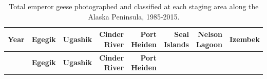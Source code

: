 \documentclass[]{article}
\begin{document}
\begin{longtable}[]{@{}rrrrrrrr@{}}
\caption{Total emperor geese photographed and classified at each staging
area along the Alaska Peninsula, 1985-2015.}\tabularnewline
\toprule
\begin{minipage}[b]{0.08\columnwidth}\raggedleft\strut
\textbf{Year}\strut
\end{minipage} & \begin{minipage}[b]{0.10\columnwidth}\raggedleft\strut
\textbf{Egegik}\strut
\end{minipage} & \begin{minipage}[b]{0.11\columnwidth}\raggedleft\strut
\textbf{Ugashik}\strut
\end{minipage} & \begin{minipage}[b]{0.08\columnwidth}\raggedleft\strut
\textbf{Cinder River}\strut
\end{minipage} & \begin{minipage}[b]{0.14\columnwidth}\raggedleft\strut
\textbf{Port Heiden}\strut
\end{minipage} & \begin{minipage}[b]{0.09\columnwidth}\raggedleft\strut
\textbf{Seal Islands}\strut
\end{minipage} & \begin{minipage}[b]{0.08\columnwidth}\raggedleft\strut
\textbf{Nelson Lagoon}\strut
\end{minipage} & \begin{minipage}[b]{0.10\columnwidth}\raggedleft\strut
\textbf{Izembek}\strut
\end{minipage}\tabularnewline
\midrule
\endfirsthead
\toprule
\begin{minipage}[b]{0.08\columnwidth}\raggedleft\strut
~\strut
\end{minipage} & \begin{minipage}[b]{0.10\columnwidth}\raggedleft\strut
\textbf{Egegik}\strut
\end{minipage} & \begin{minipage}[b]{0.11\columnwidth}\raggedleft\strut
\textbf{Ugashik}\strut
\end{minipage} & \begin{minipage}[b]{0.08\columnwidth}\raggedleft\strut
\textbf{Cinder River}\strut
\end{minipage} & \begin{minipage}[b]{0.14\columnwidth}\raggedleft\strut
\textbf{Port Heiden}\strut
\end{minipage} & \begin{minipage}[b]{0.09\columnwidth}\raggedleft\strut

\end{minipage}
\end{longtable}
\end{document}
